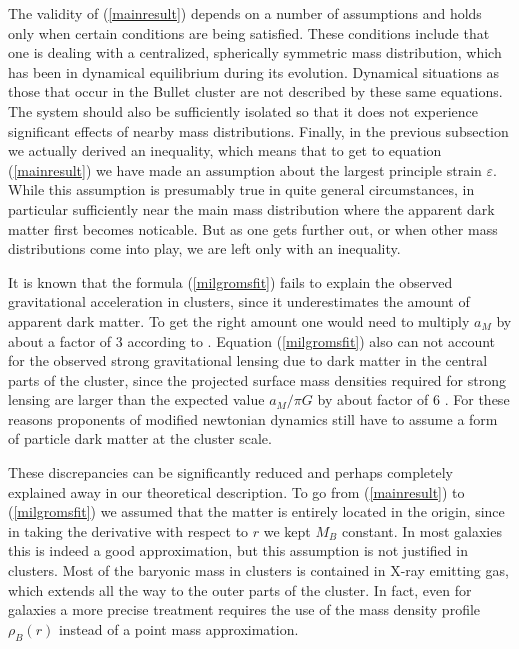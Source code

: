 \documentclass[a4paper,12pt]{article}
\begin{document}
The validity of (\ref{mainresult}) depends on a number of assumptions and holds only when certain conditions are being satisfied.  These conditions include that one is dealing with a centralized, spherically symmetric mass distribution, which has been in  dynamical equilibrium during its evolution. Dynamical situations as those that occur in the Bullet cluster are not described by these same equations. The system should also be sufficiently isolated so that it does not experience significant effects of nearby mass distributions. Finally, in the previous subsection we actually derived an inequality, which means that to get to equation (\ref{mainresult}) we have made an assumption about the largest principle strain $\varepsilon$. While this assumption is presumably true in quite general circumstances, in particular sufficiently near the main mass distribution where the apparent dark matter first becomes noticable. But as one gets further out, or when  other mass distributions come into play, we are left only with an inequality. 



It is known that the formula (\ref{milgromsfit}) fails to explain the observed gravitational acceleration in clusters, since it underestimates the amount of apparent dark matter. To get the right amount one would need to multiply $a_M$ by about a factor of 3 according to \cite{BekensteinMilgrom, Sanders}. Equation (\ref{milgromsfit}) also can not account for the observed strong gravitational lensing due to dark matter in the central parts of the cluster, since the projected surface mass densities required for strong lensing are larger than the expected value $a_M/\pi G$ by about factor of 6 \cite{Sanderslens}.  For these reasons proponents of  modified newtonian dynamics still have to assume a form of particle dark matter at the cluster scale. 

These discrepancies can be significantly reduced and perhaps completely explained away in our theoretical description.  To go from (\ref{mainresult}) to (\ref{milgromsfit}) we assumed that the matter is entirely located in the origin, since in taking the derivative with respect to $r$ we kept $M_B$ constant.   In most galaxies this is indeed a good approximation, but this assumption is not justified in clusters. Most of the baryonic mass in clusters is contained in X-ray emitting gas, which extends all the way to the outer parts of the cluster. In fact, even for galaxies a more precise treatment requires the use of the mass density profile $\rho_B(r)$ instead of a point mass approximation.  
\end{document}
